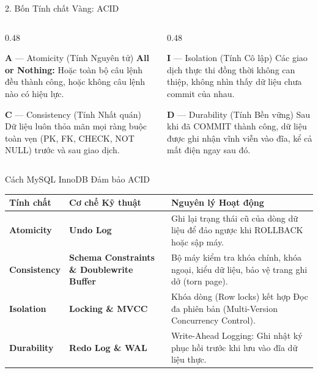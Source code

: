 \documentclass[aspectratio=169,11pt]{beamer}
\begin{document}
\begin{frame}{2. Bốn Tính chất Vàng: ACID}
  \begin{columns}[T]
    \begin{column}{0.48\textwidth}
      \begin{block}{\textbf{A} --- Atomicity (Tính Nguyên tử)}
        \textbf{All or Nothing:} Hoặc toàn bộ câu lệnh đều thành công, hoặc không câu lệnh nào có hiệu lực.
      \end{block}
      \vspace{0.3em}
      \begin{block}{\textbf{C} --- Consistency (Tính Nhất quán)}
        Dữ liệu luôn thỏa mãn mọi ràng buộc toàn vẹn (PK, FK, CHECK, NOT NULL) trước và sau giao dịch.
      \end{block}
    \end{column}
    \begin{column}{0.48\textwidth}
      \begin{block}{\textbf{I} --- Isolation (Tính Cô lập)}
        Các giao dịch thực thi đồng thời không can thiệp, không nhìn thấy dữ liệu chưa commit của nhau.
      \end{block}
      \vspace{0.3em}
      \begin{block}{\textbf{D} --- Durability (Tính Bền vững)}
        Sau khi đã COMMIT thành công, dữ liệu được ghi nhận vĩnh viễn vào đĩa, kể cả mất điện ngay sau đó.
      \end{block}
    \end{column}
  \end{columns}
\end{frame}

\begin{frame}{Cách MySQL InnoDB Đảm bảo ACID}
  \begin{table}
    \centering
    \small
    \begin{tabularx}{\textwidth}{l p{4.2cm} X}
      \toprule
      \textbf{Tính chất} & \textbf{Cơ chế Kỹ thuật} & \textbf{Nguyên lý Hoạt động} \\
      \midrule
      \textbf{Atomicity} & \textbf{Undo Log} & Ghi lại trạng thái cũ của dòng dữ liệu để đảo ngược khi ROLLBACK hoặc sập máy. \\
      \textbf{Consistency} & \textbf{Schema Constraints \& Doublewrite Buffer} & Bộ máy kiểm tra khóa chính, khóa ngoại, kiểu dữ liệu, bảo vệ trang ghi dở (torn page). \\
      \textbf{Isolation} & \textbf{Locking \& MVCC} & Khóa dòng (Row locks) kết hợp Đọc đa phiên bản (Multi-Version Concurrency Control). \\
      \textbf{Durability} & \textbf{Redo Log \& WAL} & Write-Ahead Logging: Ghi nhật ký phục hồi trước khi lưu vào đĩa dữ liệu thực. \\
      \bottomrule
    \end{tabularx}
  \end{table}
\end{frame}
\end{document}
